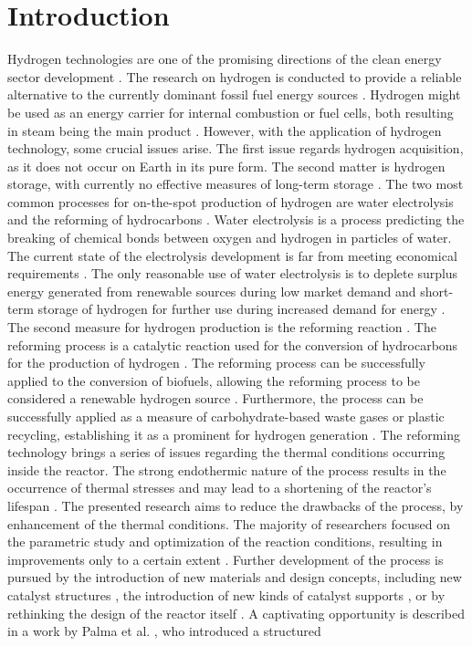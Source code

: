 \documentclass[preprint,12pt]{elsarticle}
\begin{document}

\section{Introduction}

Hydrogen technologies are one of the promising directions of the clean energy sector development \cite{Qazi2022}. The research on hydrogen is conducted to provide a reliable alternative to the currently dominant fossil fuel energy sources \cite{Zou2016, Liobikiene2021}. Hydrogen might be used as an energy carrier for internal combustion or fuel cells, both resulting in steam being the main product \cite{Xu2020, Shadidi2021}.
 However, with the application of hydrogen technology, some crucial issues arise. The first issue regards hydrogen acquisition, as it does not occur on Earth in its pure form. The second matter is hydrogen storage, with currently no effective measures of long-term storage \cite{Hassan2021, Tarhan2022}.  The two most common processes for on-the-spot production of hydrogen are water electrolysis and the reforming of hydrocarbons  \cite{Hassan2021RSER, Azizan2020}. Water electrolysis is a process predicting the breaking of chemical bonds between oxygen and hydrogen in particles of water. The current state of the electrolysis development is far from meeting economical requirements \cite{Yukesh2021}. The only reasonable use of water electrolysis is to deplete surplus energy generated from renewable sources during low market demand and short-term storage of hydrogen for further use during increased demand for energy \cite{Chi2018}. The second measure for hydrogen production is the reforming reaction \cite{Zhang2021, Nkulikiyinka2020}. The reforming process is a catalytic reaction used for the conversion of hydrocarbons for the production of hydrogen \cite{Taherian2022, Faheem2022}. The reforming process can be successfully applied to the conversion of biofuels, allowing the reforming process to be considered a renewable hydrogen source \cite{Zhao2020, Gao2022}. Furthermore, the process can be successfully applied as a measure of carbohydrate-based waste gases or plastic recycling, establishing it as a prominent for hydrogen generation \cite{Saad2016, Zhang2022}. The reforming technology brings a series of issues regarding the thermal conditions occurring inside the reactor. The strong endothermic nature of the process results in the occurrence of thermal stresses and may lead to a shortening of the reactor's lifespan \cite{Mozdzierz2014}. The presented research aims to reduce the drawbacks of the process, by enhancement of the thermal conditions. The majority of researchers focused on the parametric study and optimization of the reaction conditions, resulting in improvements only to a certain extent \cite{Simpson2007, Naseri2015}. Further development of the process is pursued by the introduction of new materials and design concepts, including new catalyst structures \cite{Ali2016, Kolaczkowski2016}, the introduction of new kinds of catalyst supports \cite{Yadav2019}, or by rethinking the design of the reactor itself \cite{Butcher2014, Meloni2020, Cherif2022}.  A captivating opportunity is described in a work by Palma et al. \cite{Palma2017}, who introduced a structured 
\end{document}
